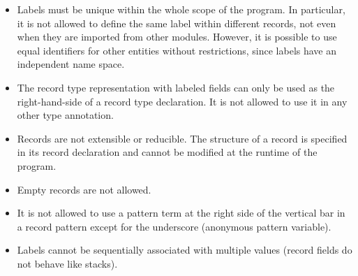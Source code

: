 \begin{itemize}
\item Labels must be unique within the whole scope of the program.
  In particular, it is not allowed to define the same label within
  different records, not even when they are imported from other
  modules. However, it is possible to use equal identifiers for other
  entities without restrictions, since labels have an independent
  name space.
\item The record type representation with labeled fields can only be
  used as the right-hand-side of a record type declaration. It is
  not allowed to use it in any other type annotation.
\item Records are not extensible or reducible. The structure of a
  record is specified in its record declaration and cannot be
  modified at the runtime of the program.
\item Empty records are not allowed.
\item It is not allowed  to use a pattern term
  at the right side of the vertical bar in a record pattern
  except for the underscore (anonymous pattern variable).
\item Labels cannot be sequentially associated with multiple values
  (record fields do not behave like stacks).
\end{itemize}

